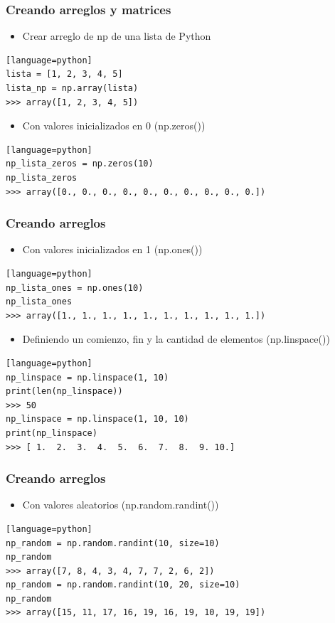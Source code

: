 \documentclass[hyperref={pdfpagelabels=false},xcolor=pst,pdf,fragile]{beamer}
\begin{document}
\begin{frame} [fragile]
    \frametitle{Creando arreglos y matrices}
    \begin{itemize}
    \item Crear arreglo de np de una lista de Python
    \end{itemize}
    \begin{lstlisting}[basicstyle=\tiny][language=python]
lista = [1, 2, 3, 4, 5]
lista_np = np.array(lista)
>>> array([1, 2, 3, 4, 5])
    \end{lstlisting}
    
    \begin{itemize}
    \item Con valores inicializados en 0 (np.zeros())
    \end{itemize}
    \begin{lstlisting}[basicstyle=\tiny][language=python]
np_lista_zeros = np.zeros(10)
np_lista_zeros
>>> array([0., 0., 0., 0., 0., 0., 0., 0., 0., 0.])
    \end{lstlisting}
\end{frame}

\begin{frame} [fragile]
    \frametitle{Creando arreglos}
    
    \begin{itemize}
    \item Con valores inicializados en 1 (np.ones())
    \end{itemize}
    \begin{lstlisting}[basicstyle=\tiny][language=python]
np_lista_ones = np.ones(10)
np_lista_ones
>>> array([1., 1., 1., 1., 1., 1., 1., 1., 1., 1.])
    \end{lstlisting}
    
    \begin{itemize}
    \item Definiendo un comienzo, fin y la cantidad de elementos (np.linspace())
    \end{itemize}
    \begin{lstlisting}[basicstyle=\tiny][language=python]
np_linspace = np.linspace(1, 10)
print(len(np_linspace))
>>> 50
np_linspace = np.linspace(1, 10, 10)
print(np_linspace)
>>> [ 1.  2.  3.  4.  5.  6.  7.  8.  9. 10.]
    \end{lstlisting}
\end{frame}

\begin{frame} [fragile]
    \frametitle{Creando arreglos}
    \begin{itemize}
    \item Con valores aleatorios (np.random.randint())
    \end{itemize}
    \begin{lstlisting}[basicstyle=\tiny][language=python]
np_random = np.random.randint(10, size=10)
np_random
>>> array([7, 8, 4, 3, 4, 7, 7, 2, 6, 2])
np_random = np.random.randint(10, 20, size=10)
np_random
>>> array([15, 11, 17, 16, 19, 16, 19, 10, 19, 19])
    \end{lstlisting}

\end{frame}
\end{document}
